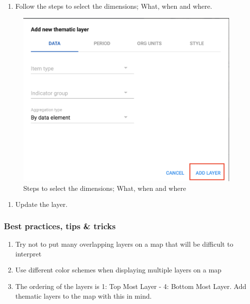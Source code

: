 \documentclass[]{book}
\providecommand{\tightlist}{%
  \setlength{\itemsep}{0pt}\setlength{\parskip}{0pt}}
\begin{document}
\begin{enumerate}
\def\labelenumi{\arabic{enumi}.}
\setcounter{enumi}{3}
\tightlist
\item
  Follow the steps to select the dimensions; What, when and where.
\end{enumerate}

\begin{figure}
\includegraphics[width=16.64in]{./images/maps} \caption{Steps to select the dimensions; What, when and where}\label{fig:maps}
\end{figure}

\begin{enumerate}
\def\labelenumi{\arabic{enumi}.}
\setcounter{enumi}{4}
\tightlist
\item
  Update the layer.
\end{enumerate}

\hypertarget{best-practices-tips-tricks-1}{%
\subsubsection{Best practices, tips \& tricks}\label{best-practices-tips-tricks-1}}

\begin{enumerate}
\def\labelenumi{\arabic{enumi}.}
\tightlist
\item
  Try not to put many overlapping layers on a map that will be difficult to interpret
\item
  Use different color schemes when displaying multiple layers on a map
\item
  The ordering of the layers is 1: Top Most Layer - 4: Bottom Most Layer. Add thematic layers to the map with this in mind.
\end{enumerate}
\end{document}
